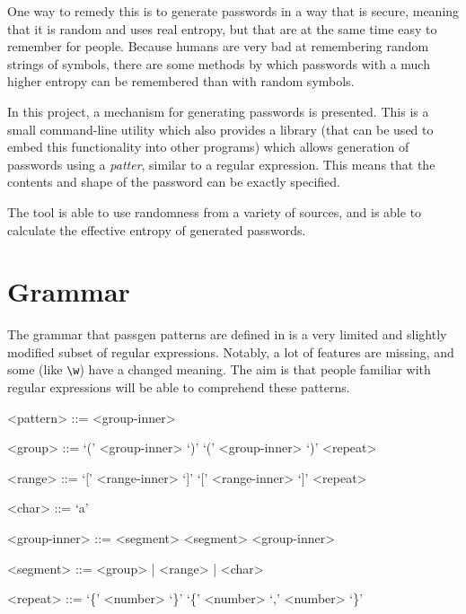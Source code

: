 \documentclass[a4paper,twocolumn]{article}
\begin{document}
One way to remedy this is to generate passwords in a way that is secure, meaning that it is random and uses real entropy, but that are at the same time easy to remember for people. Because humans are very bad at remembering random strings of symbols, there are some methods by which passwords with a much higher entropy can be remembered than with random symbols.

In this project, a mechanism for generating passwords is presented. This is a small command-line utility which also provides a library (that can be used to embed this functionality into other programs) which allows generation of passwords using a \emph{patter}, similar to a regular expression. This means that the contents and shape of the password can be exactly specified.

The tool is able to use randomness from a variety of sources, and is able to calculate the effective entropy of generated passwords.

\section{Grammar}

The grammar that passgen patterns are defined in is a very limited and slightly modified subset of regular expressions. Notably, a lot of features are missing, and some (like \verb|\w|) have a changed meaning. The aim is that people familiar with regular expressions will be able to comprehend these patterns.

\setlength{\grammarindent}{4em}
\begin{grammar}

<pattern> ::= <group-inner>

<group> ::= ‘(’ <group-inner> ‘)’ \alt ‘(’ <group-inner> ‘)’ <repeat>

<range> ::= ‘[’ <range-inner> ‘]’ \alt ‘[’ <range-inner> ‘]’ <repeat>

<char> ::= ‘a’

<group-inner> ::= <segment> \alt <segment> <group-inner>

<segment> ::= <group> | <range> | <char>

<repeat> ::= ‘\{’ <number> ‘\}’ \alt ‘\{’ <number> ‘,’ <number> ‘\}’

\end{grammar}
\end{document}
